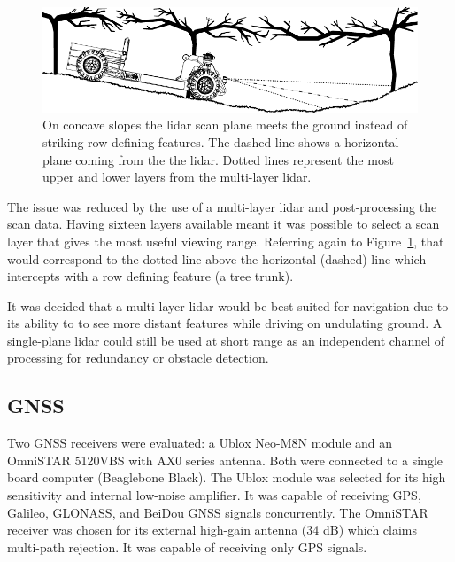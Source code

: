 \documentclass[preprint,authoryear,12pt]{elsarticle}
\begin{document}
        \begin{figure}[htb]
            \centering
            \includegraphics[width=\linewidth]{images/concave_slope_v4.pdf}
            \caption{
                On concave slopes the lidar scan plane meets the ground instead of striking row-defining features.
                The dashed line shows a horizontal plane coming from the the lidar.
                Dotted lines represent the most upper and lower layers from the multi-layer lidar.
            }
            \label{fig:concaveSlope}
        \end{figure}

        The issue was reduced by the use of a multi-layer lidar and post-processing the scan data.
        Having sixteen layers available meant it was possible to select a scan layer that gives the most useful viewing range.
        Referring again to Figure~\ref{fig:concaveSlope}, that would correspond to the dotted line above the horizontal (dashed) line which intercepts with a row defining feature (a tree trunk).

        It was decided that a multi-layer lidar would be best suited for navigation due to its ability to to see more distant features while driving on undulating ground.
        A single-plane lidar could still be used at short range as an independent channel of processing for redundancy or obstacle detection.

    \subsection{GNSS}
        Two GNSS receivers were evaluated: a Ublox Neo-M8N module and an OmniSTAR 5120VBS with AX0 series antenna.
        Both were connected to a single board computer (Beaglebone Black).
        The Ublox module was selected for its high sensitivity and internal low-noise amplifier.
        It was capable of receiving GPS, Galileo, GLONASS, and BeiDou GNSS signals concurrently.
        The OmniSTAR receiver was chosen for its external high-gain antenna (34 dB) which claims multi-path rejection.
        It was capable of receiving only GPS signals.
\end{document}
